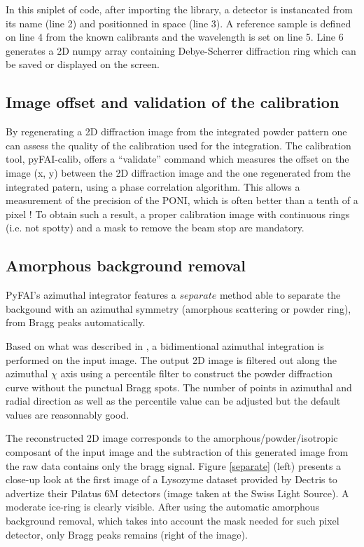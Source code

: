 \documentclass[preprint]{iucr}
\begin{document}
In this sniplet of code, after importing the library, a detector is instancated
from its name (line 2) and positionned in space (line 3).
A reference sample is defined on line 4 from the known calibrants and the
wavelength is set on line 5. Line 6 generates a 2D numpy array containing
Debye-Scherrer diffraction ring which can be saved or displayed on the screen.

\subsection{Image offset and validation of the calibration}
By regenerating a 2D diffraction image from the integrated powder pattern one
can assess the quality of the calibration used for the integration.
The calibration tool, pyFAI-calib, offers  a ``validate'' command which measures
the offset on the image (x, y) between the 2D diffraction image and the one
regenerated from the integrated patern, using a phase correlation algorithm.
This allows a measurement of the precision of the PONI, which is often better
than a tenth of a pixel !
To obtain such a result, a proper calibration image with continuous rings (i.e.
not spotty) and a mask to remove the beam stop are mandatory.

\subsection{Amorphous background removal}

PyFAI's azimuthal integrator features a $separate$ method able to separate
the backgound with an azimuthal symmetry (amorphous scattering or powder ring),
from Bragg peaks automatically.

Based on what was described in \cite{PyFAI_PDJ}, a bidimentional azimuthal
integration is performed on the input image.
The output 2D image is filtered out along the azimuthal $\chi$ axis using a
percentile filter to construct the powder diffraction curve without the punctual
Bragg spots.
The number of points in azimuthal and radial direction as well as
the percentile value can be adjusted but the default values are reasonnably
good.

The reconstructed 2D image corresponds to the amorphous/powder/isotropic
composant of the input image and the subtraction of this generated image from
the raw data contains only the bragg signal.
Figure \ref{separate} (left)
presents a close-up look at the first image of a Lysozyme dataset provided by Dectris to
advertize their Pilatus 6M detectors (image taken at the Swiss Light Source). A
moderate ice-ring is clearly visible. After using the automatic amorphous
background removal, which takes into account the mask needed for such pixel
detector, only Bragg peaks remains (right of the image).
\end{document}
